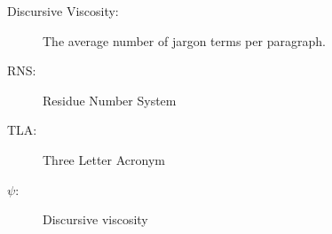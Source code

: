 

\begin{description}
\item[Discursive Viscosity:] The average number of jargon terms per
paragraph.
\item[RNS:] Residue Number System
\item[TLA:] Three Letter Acronym
\item[\(\psi\):] Discursive viscosity

\end{description}
